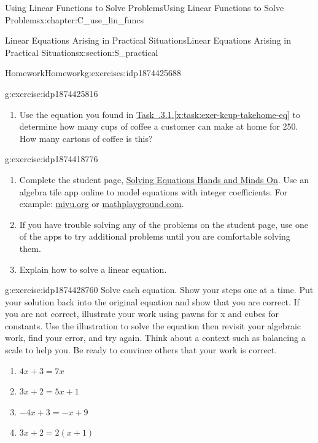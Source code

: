 \documentclass[oneside,10pt,]{book}
\newcommand{\xreffont}{\relax}
\numberwithin{equation}{chapter}
\begin{document}
\begin{chapterptx}{Using Linear Functions to Solve Problems}{}{Using Linear Functions to Solve Problems}{}{}{x:chapter:C_use_lin_funcs}
\begin{sectionptx}{Linear Equations Arising in Practical Situations}{}{Linear Equations Arising in Practical Situations}{}{}{x:section:S_practical}
\begin{exercises-subsection}{Homework}{}{Homework}{}{}{g:exercises:idp1874425688}
\begin{divisionexercise}{1}{}{}{g:exercise:idp1874425816}
\begin{enumerate}[font=\bfseries,label=(\alph*),ref=\alph*]
\item{}Use the equation you found in \hyperref[x:task:exer-kcup-takehome-eq]{Task~{\xreffont 3.1.3.1}.{\xreffont\ref{x:task:exer-kcup-takehome-eq}}} to determine how many cups of coffee a customer can make at home for \textdollar{}250. How many cartons of coffee is this?%
\end{enumerate}
\end{divisionexercise}%
\begin{divisionexercise}{2}{}{}{g:exercise:idp1874418776}%
\begin{enumerate}[font=\bfseries,label=(\alph*),ref=\alph*]
\item{}Complete the student page, \hyperref[x:worksheet:act-eq-hands-on]{Solving Equations \textemdash{} Hands and Minds On}. Use an algebra tile app online to model equations with integer coefficients. For example: \href{http://media.mivu.org/mvu_pd/a4a/homework/index.html}{mivu.org}\footnotemark{} or \href{http://www.mathplayground.com/AlgebraEquations.html}{mathplayground.com}\footnotemark{}.%
\item{}If you have trouble solving any of the problems on the student page, use one of the apps to try additional problems until you are comfortable solving them.%
\item{}Explain how to solve a linear equation.%
\end{enumerate}
\end{divisionexercise}%
%
%
\begin{divisionexercise}{3}{}{}{g:exercise:idp1874428760}%
Solve each equation. Show your steps one at a time. Put your solution back into the original equation and show that you are correct. If you are not correct, illustrate your work using pawns for x and cubes for constants. Use the illustration to solve the equation then revisit your algebraic work, find your error, and try again. Think about a context such as balancing a scale to help you. Be ready to convince others that your work is correct.%
\begin{enumerate}[font=\bfseries,label=(\alph*),ref=\alph*]
\item{}\(4x + 3 = 7x\)%
\item{}\(3x + 2 = 5x + 1\)%
\item{}\(-4x + 3 = -x + 9\)%
\item{}\(3x + 2 = 2 \left( x + 1 \right)\)%

\end{enumerate}
\end{divisionexercise}
\end{exercises-subsection}
\end{sectionptx}
\end{chapterptx}
\end{document}
